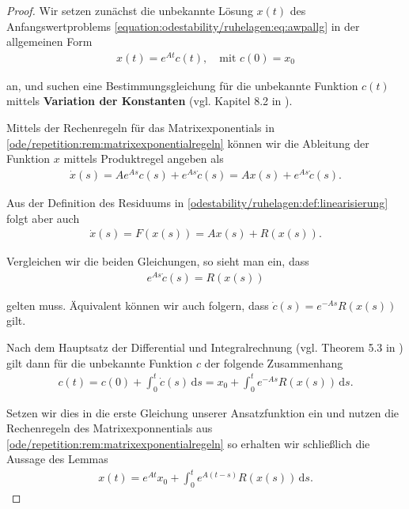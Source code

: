 \documentclass[letterpaper,10pt,english]{jupyterBook}
\begin{document}
\begin{proof}
 Wir setzen zunächst die unbekannte Lösung \(x(t)\) des Anfangswertproblems \eqref{equation:odestability/ruhelagen:eq:awpallg} in der allgemeinen Form
\begin{align*}
x(t) = e^{At}c(t),\quad \text{mit }c(0) = x_0
\end{align*}
\par
an, und suchen eine Bestimmungsgleichung für die unbekannte Funktion \(c(t)\) mittels \textbf{Variation der Konstanten} (vgl. Kapitel 8.2 in \cite{Ten21}).

\par
Mittels der Rechenregeln für das Matrixexponentials in \cref{ode/repetition:rem:matrixexponentialregeln} können wir die Ableitung der Funktion \(x\) mittels Produktregel angeben als
\begin{align*}
\dot{x}(s) = A e^{As}c(s)+ e^{As}\dot{c}(s) = Ax(s) + e^{As}\dot{c}(s).
\end{align*}
\par
Aus der Definition des Residuums in \cref{odestability/ruhelagen:def:linearisierung} folgt aber auch
\begin{align*}
\dot{x}(s) = F(x(s)) = Ax(s) + R(x(s)).
\end{align*}
\par
Vergleichen wir die beiden Gleichungen, so sieht man ein, dass
\begin{align*}
e^{As}\dot{c}(s) = R(x(s))
\end{align*}
\par
gelten muss.
Äquivalent können wir auch folgern, dass \(\dot{c}(s) = e^{-As}R(x(s))\) gilt.

\par
Nach dem Hauptsatz der Differential  und Integralrechnung (vgl. Theorem 5.3 in \cite{Ten21}) gilt dann für die unbekannte Funktion \(c\) der folgende Zusammenhang
\begin{align*}
c(t) = c(0) + \int_0^t \dot{c}(s)\, \mathrm{d}s = x_0+ \int_0^t e^{-As}R(x(s)) \, \mathrm{d}s.
\end{align*}
\par
Setzen wir dies in die erste Gleichung unserer Ansatzfunktion ein und nutzen die Rechenregeln des Matrixexponnentials aus \cref{ode/repetition:rem:matrixexponentialregeln}  so erhalten wir schließlich die Aussage des Lemmas
\begin{align*}
x(t) = e^{At}x_0+ \int_0^t e^{A(t-s)}R(x(s)) \, \mathrm{d}s.
\end{align*}\end{proof}
\end{document}
